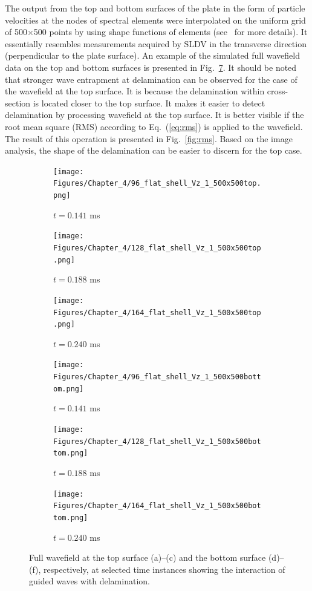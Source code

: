 The output from the top and bottom surfaces of the plate in the form of particle velocities at the nodes of spectral elements were interpolated on the uniform grid of 500\(\times\)500 points by using shape functions of elements (see~\cite{Kudela2020} for more details).
It essentially resembles measurements acquired by SLDV in the transverse direction (perpendicular to the plate surface).
An example of the simulated full wavefield data on the top and bottom surfaces is presented in Fig.~\ref{fig:wavefield}.
It should be noted that stronger wave entrapment at delamination can be observed for the case of the wavefield at the top surface.
It is because the delamination within cross-section is located closer to the top surface.
It makes it easier to detect delamination by processing wavefield at the top surface.
It is better visible if the root mean square (RMS) according to Eq.~(\ref{eq:rms}) is applied to the wavefield.
The result of this operation is presented in Fig.~\ref{fig:rms}.
Based on the image analysis, the shape of the delamination can be easier to discern for the top case.
\begin{figure} [h!]
	\centering
	\begin{subfigure}[b]{0.32\textwidth}
		\centering
		\texttt{[image: Figures/Chapter\_4/96\_flat\_shell\_Vz\_1\_500x500top.png]}
		\caption{\(t=0.141\) ms}
		\label{fig:frame96top}
	\end{subfigure}
	\hfill
	\begin{subfigure}[b]{0.32\textwidth}
		\centering
		\texttt{[image: Figures/Chapter\_4/128\_flat\_shell\_Vz\_1\_500x500top.png]}
		\caption{\(t=0.188\) ms}
		\label{fig:frame128top}
	\end{subfigure}
	\hfill
	\begin{subfigure}[b]{0.32\textwidth}
		\centering
		\texttt{[image: Figures/Chapter\_4/164\_flat\_shell\_Vz\_1\_500x500top.png]}
		\caption{\(t=0.240\) ms}
		\label{fig:frame164top}
	\end{subfigure}	
	\hfill
	\begin{subfigure}[b]{0.32\textwidth}
		\centering
		\texttt{[image: Figures/Chapter\_4/96\_flat\_shell\_Vz\_1\_500x500bottom.png]}
		\caption{\(t=0.141\) ms}
		\label{fig:frame96bottom}
	\end{subfigure}
	\hfill
	\begin{subfigure}[b]{0.32\textwidth}
		\centering
		\texttt{[image: Figures/Chapter\_4/128\_flat\_shell\_Vz\_1\_500x500bottom.png]}
		\caption{\(t=0.188\) ms}
		\label{fig:frame128bottom}
	\end{subfigure}
	\hfill
	\begin{subfigure}[b]{0.32\textwidth}
		\centering
		\texttt{[image: Figures/Chapter\_4/164\_flat\_shell\_Vz\_1\_500x500bottom.png]}
		\caption{\(t=0.240\) ms}
		\label{fig:frame164bottom}
	\end{subfigure}
	
	\caption{Full wavefield at the top surface (a)--(c) and the bottom surface (d)--(f), respectively, at selected time instances showing the interaction of guided waves with delamination.}
	\label{fig:wavefield}
\end{figure} 

